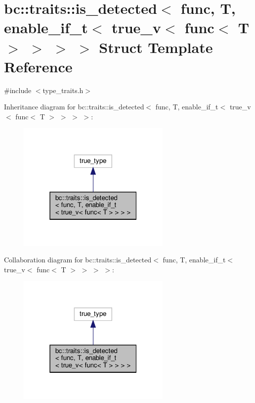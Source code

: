 \hypertarget{structbc_1_1traits_1_1is__detected_3_01func_00_01T_00_01enable__if__t_3_01true__v_3_01func_3_01T_01_4_01_4_01_4_01_4}{}\section{bc\+:\+:traits\+:\+:is\+\_\+detected$<$ func, T, enable\+\_\+if\+\_\+t$<$ true\+\_\+v$<$ func$<$ T $>$ $>$ $>$ $>$ Struct Template Reference}
\label{structbc_1_1traits_1_1is__detected_3_01func_00_01T_00_01enable__if__t_3_01true__v_3_01func_3_01T_01_4_01_4_01_4_01_4}


{\ttfamily \#include $<$type\+\_\+traits.\+h$>$}



Inheritance diagram for bc\+:\+:traits\+:\+:is\+\_\+detected$<$ func, T, enable\+\_\+if\+\_\+t$<$ true\+\_\+v$<$ func$<$ T $>$ $>$ $>$ $>$\+:\nopagebreak
\begin{figure}[H]
\begin{center}
\leavevmode
\includegraphics[width=211pt]{structbc_1_1traits_1_1is__detected_3_01func_00_01T_00_01enable__if__t_3_01true__v_3_01func_3_01Tf35d12c4f72a6a75ab5eeac2a33fdd7e}
\end{center}
\end{figure}


Collaboration diagram for bc\+:\+:traits\+:\+:is\+\_\+detected$<$ func, T, enable\+\_\+if\+\_\+t$<$ true\+\_\+v$<$ func$<$ T $>$ $>$ $>$ $>$\+:\nopagebreak
\begin{figure}[H]
\begin{center}
\leavevmode
\includegraphics[width=211pt]{structbc_1_1traits_1_1is__detected_3_01func_00_01T_00_01enable__if__t_3_01true__v_3_01func_3_01T69d8fbea2b4eb58ec55a65745f871f61}
\end{center}
\end{figure}


